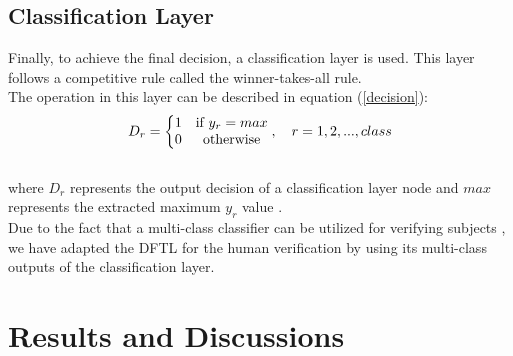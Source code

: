 \documentclass[conference]{IEEEtran}
\begin{document}
\subsection{Classification Layer}
Finally, to achieve the final decision, a classification layer is used. This layer follows a competitive rule called the winner-takes-all rule. \\
The operation in this layer can be described in equation (\ref{decision}): \\
\begin{equation}
D_{r}=\left\{\begin{matrix}
1 & $if$~y_{r}=max \\ 
0 &  $otherwise$
\end{matrix}\right.
,~~~r=1,2,...,class
\label{decision}
\end{equation}\\
where $D_{r}$ represents the output decision of a classification layer node and $max$ represents the extracted maximum $y_{r}$ value \cite{Al-Nima2017Signal}.\\
Due to the fact that a multi-class classifier can be utilized for verifying subjects \cite{Al-Nima2015Human} \cite{Al-Nima2017finger}, we have adapted the DFTL for the human verification by using its multi-class outputs of the classification layer.

\section{Results and Discussions}
\end{document}
